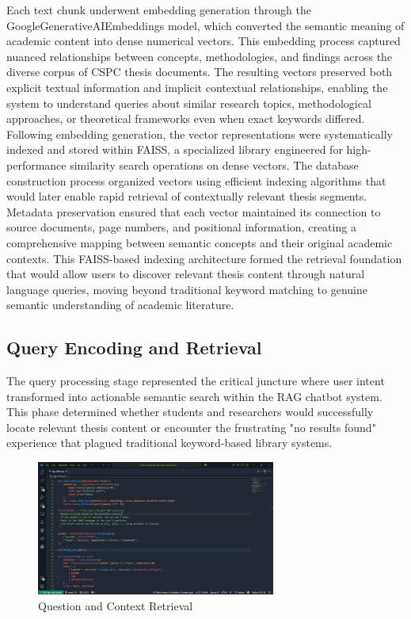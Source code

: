 \begin{refsection}
Each text chunk underwent embedding generation through the GoogleGenerativeAIEmbeddings model, which converted the semantic meaning of academic content into dense numerical vectors. This embedding process captured nuanced relationships between concepts, methodologies, and findings across the diverse corpus of CSPC thesis documents. The resulting vectors preserved both explicit textual information and implicit contextual relationships, enabling the system to understand queries about similar research topics, methodological approaches, or theoretical frameworks even when exact keywords differed. Following embedding generation, the vector representations were systematically indexed and stored within FAISS, a specialized library engineered for high-performance similarity search operations on dense vectors. The database construction process organized vectors using efficient indexing algorithms that would later enable rapid retrieval of contextually relevant thesis segments. Metadata preservation ensured that each vector maintained its connection to source documents, page numbers, and positional information, creating a comprehensive mapping between semantic concepts and their original academic contexts. This FAISS-based indexing architecture formed the retrieval foundation that would allow users to discover relevant thesis content through natural language queries, moving beyond traditional keyword matching to genuine semantic understanding of academic literature.


\subsection{Query Encoding and Retrieval}
The query processing stage represented the critical juncture where user intent transformed into actionable semantic search within the RAG chatbot system. This phase determined whether students and researchers would successfully locate relevant thesis content or encounter the frustrating "no results found" experience that plagued traditional keyword-based library systems.

\begin{figure}[h]
    \centering
    \includegraphics[width=0.7\textwidth]{figures/qandcntxtret.png}
    \caption{Question and Context Retrieval}
\end{figure}


\end{refsection}
